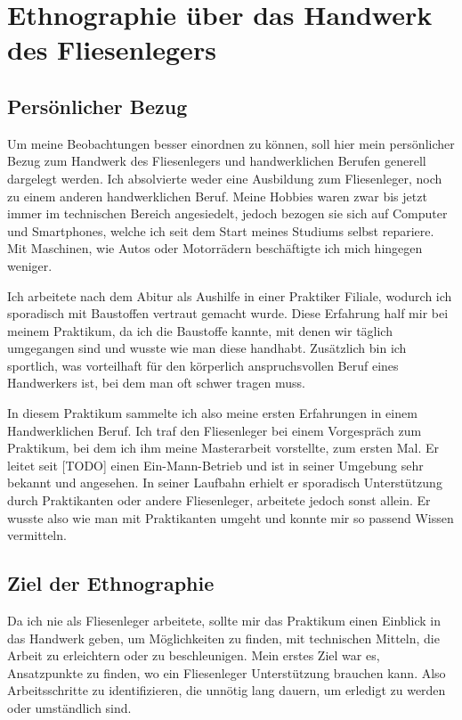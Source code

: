 \chapter{Ethnographie über das Handwerk des Fliesenlegers}

\section{Persönlicher Bezug}

Um meine Beobachtungen besser einordnen zu können, soll hier mein persönlicher Bezug zum Handwerk des Fliesenlegers und handwerklichen Berufen generell dargelegt werden. Ich absolvierte weder eine Ausbildung zum Fliesenleger, noch zu einem anderen handwerklichen Beruf. Meine Hobbies waren zwar bis jetzt immer im technischen Bereich angesiedelt, jedoch bezogen sie sich auf Computer und Smartphones, welche ich seit dem Start meines Studiums selbst repariere. Mit Maschinen, wie Autos oder Motorrädern beschäftigte ich mich hingegen weniger. 

Ich arbeitete nach dem Abitur als Aushilfe in einer Praktiker Filiale, wodurch ich sporadisch mit Baustoffen vertraut gemacht wurde. Diese Erfahrung half mir bei meinem Praktikum, da ich die Baustoffe kannte, mit denen wir täglich umgegangen sind und wusste wie man diese handhabt. Zusätzlich bin ich sportlich, was vorteilhaft für den körperlich anspruchsvollen Beruf eines Handwerkers ist, bei dem man oft schwer tragen muss.

In diesem Praktikum sammelte ich also meine ersten Erfahrungen in einem Handwerklichen Beruf. Ich traf den Fliesenleger bei einem Vorgespräch zum Praktikum, bei dem ich ihm meine Masterarbeit vorstellte, zum ersten Mal. Er leitet seit [TODO] einen Ein-Mann-Betrieb und ist in seiner Umgebung sehr bekannt und angesehen. In seiner Laufbahn erhielt er sporadisch Unterstützung durch Praktikanten oder andere Fliesenleger, arbeitete jedoch sonst allein. Er wusste also wie man mit Praktikanten umgeht und konnte mir so passend Wissen vermitteln.

\section{Ziel der Ethnographie}

Da ich nie als Fliesenleger arbeitete, sollte mir das Praktikum einen Einblick in das Handwerk geben, um Möglichkeiten zu finden, mit technischen Mitteln, die Arbeit zu erleichtern oder zu beschleunigen. Mein erstes Ziel war es, Ansatzpunkte zu finden, wo ein Fliesenleger Unterstützung brauchen kann. Also Arbeitsschritte zu identifizieren, die unnötig lang dauern, um erledigt zu werden oder umständlich sind.

